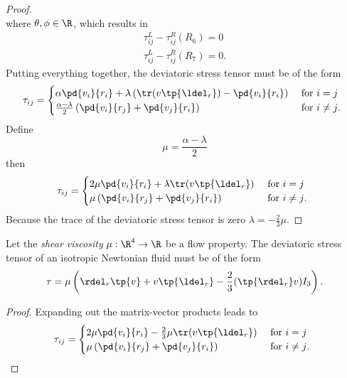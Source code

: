 \begin{proof}
\begin{equation}
    \end{equation}
    where $\theta,\phi\in \R$, which results in
    \begin{align}
        \tau^L_{ij}-\tau^R_{ij}(R_6) = 0 \\
        \tau^L_{ij}-\tau^R_{ij}(R_7) = 0.
    \end{align}
    Putting everything together, the deviatoric stress tensor must be of the form
    \begin{equation}
        \tau_{ij} = \begin{cases}
            \alpha \pd{v_i}{r_i} + \lambda \left( \tr( v \tp{\ldel_r} ) - \pd{v_i}{r_i} \right) &\text{ for $i=j$ } \\
            \frac{\alpha-\lambda}{2}\left( \pd{v_i}{r_j} + \pd{v_j}{r_i} \right) &\text{ for $i\neq j$. }
        \end{cases}
    \end{equation}
    Define
    \begin{equation}
        \mu = \frac{\alpha-\lambda}{2}
    \end{equation}
    then
    \begin{equation}
        \tau_{ij} = \begin{cases}
            2 \mu \pd{v_i}{r_i} + \lambda \tr( v \tp{\ldel_r} ) &\text{ for $i=j$ } \\
            \mu \left( \pd{v_i}{r_j} + \pd{v_j}{r_i} \right) &\text{ for $i\neq j$. }
        \end{cases}
    \end{equation}
    Because the trace of the deviatoric stress tensor is zero $\lambda = -\frac{2}{3} \mu$.
\end{proof}

\begin{thm}
    Let the \emph{shear viscosity} $\mu:\R^4\to \R$ be a flow property.
    The deviatoric stress tensor of an isotropic Newtonian fluid must be of the form
    \begin{equation}
        \tau = \mu \left( \rdel_r \tp{v} + v \tp{\ldel_r} - \frac{2}{3} (\tp{\rdel_r}v) I_3 \right).
    \end{equation}
\end{thm}
\begin{proof}
Expanding out the matrix-vector products leads to
\begin{equation}
    \tau_{ij} = \begin{cases}
        2 \mu \pd{v_i}{r_i} - \frac{2}{3} \mu \tr( v \tp{\ldel_r} ) &\text{ for $i=j$ } \\
        \mu \left( \pd{v_i}{r_j} + \pd{v_j}{r_i} \right) &\text{ for $i\neq j$. }
    \end{cases}
\end{equation}
\end{proof}

